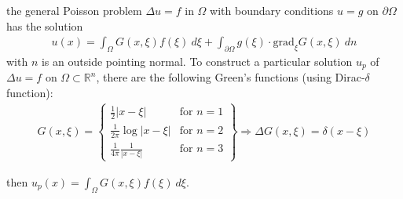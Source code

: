 the general Poisson problem $\Delta u = f$ in $\Omega$ with boundary conditions $u = g$ on $\partial\Omega$ has the solution
\begin{align*}
    u(x) = \int_\Omega G(x,\xi)f(\xi)\ d\xi + \int_{\partial\Omega} g(\xi)\cdot\mathrm{grad}_\xi G(x,\xi)\ dn
\end{align*}
with $n$ is an outside pointing normal.
To construct a particular solution $u_p$ of $\Delta u=f$ on $\Omega \subset \mathbb{R}^n$, there are the following Green's
functions (using Dirac-$\delta$ function):
\begin{align*}
    G(x,\xi) = \left\{
    \begin{matrix}
        \frac{1}{2}|x-\xi| & \text{for }n = 1 \\
        \frac{1}{2\pi}\log|x-\xi| & \text{for }n = 2 \\
        \frac{1}{4\pi}\frac{1}{|x-\xi|} & \text{for }n = 3
    \end{matrix}
    \right\}\Rightarrow\Delta G(x,\xi) = \delta(x-\xi)
\end{align*}

then $u_p(x) = \int_\Omega G(x,\xi)f(\xi)\ d\xi$.